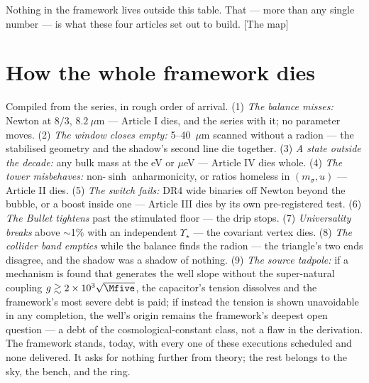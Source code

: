 Nothing in the framework lives outside this table. That --- more than any single number --- is what these four articles set out to build. [The map]

\section{How the whole framework dies}
Compiled from the series, in rough order of arrival. (1) \emph{The balance misses:} Newton at $8/3$, $8.2~\mu$m --- Article I dies, and the series with it; no parameter moves. (2) \emph{The window closes empty:} 5--40~$\mu$m scanned without a radion --- the stabilised geometry and the shadow's second line die together. (3) \emph{A state outside the decade:} any bulk mass at the eV or $\mu$eV --- Article IV dies whole. (4) \emph{The tower misbehaves:} non-$\sinh$ anharmonicity, or ratios homeless in $(m_{\sigma},u)$ --- Article II dies. (5) \emph{The switch fails:} DR4 wide binaries off Newton beyond the bubble, or a boost inside one --- Article III dies by its own pre-registered test. (6) \emph{The Bullet tightens} past the stimulated floor --- the drip stops. (7) \emph{Universality breaks} above $\sim$1\% with an independent $\Upsilon_{\star}$ --- the covariant vertex dies. (8) \emph{The collider band empties} while the balance finds the radion --- the triangle's two ends disagree, and the shadow was a shadow of nothing. (9) \emph{The source tadpole:} if a mechanism is found that generates the well slope without the super-natural coupling $g\gtrsim2\times10^{3}\sqrt{\Mfive}$, the capacitor's tension dissolves and the framework's most severe debt is paid; if instead the tension is shown unavoidable in any completion, the well's origin remains the framework's deepest open question --- a debt of the cosmological-constant class, not a flaw in the derivation. The framework stands, today, with every one of these executions scheduled and none delivered. It asks for nothing further from theory; the rest belongs to the sky, the bench, and the ring.

\appendix
